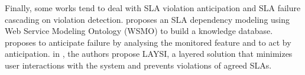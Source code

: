 Finally, some works tend to deal with SLA violation anticipation and SLA failure cascading on violation detection.  \cite{Dastjerdi:2012:DOA:2275356.2275360}  proposes an SLA dependency modeling using Web Service Modeling Ontology (WSMO) to build a knowledge database. \cite{5614035} proposes to anticipate failure by analysing the monitored feature and to act by anticipation. in
\cite{5614035}, the authors propose LAYSI, a layered solution that minimizes user interactions with the system and prevents violations of agreed SLAs.

 
